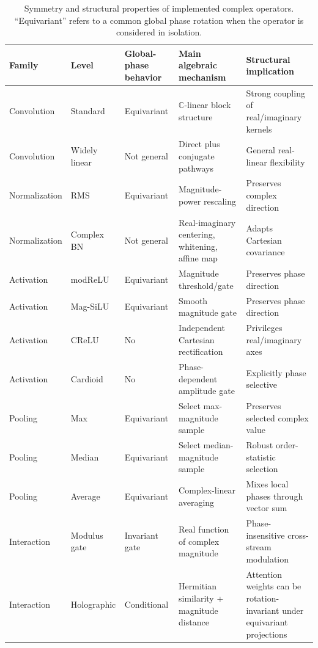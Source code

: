 \begin{table}[t]
\centering
\caption{Symmetry and structural properties of implemented complex operators. ``Equivariant'' refers to a common global phase rotation when the operator is considered in isolation.}
\label{tab:operator-properties}
\scriptsize
\begin{tabularx}{\textwidth}{L{2.2cm}L{2.8cm}C{1.5cm}L{3.6cm}X}
\toprule
Family & Level & Global-phase behavior & Main algebraic mechanism & Structural implication \\
\midrule
Convolution & Standard & Equivariant & $\mathbb{C}$-linear block structure & Strong coupling of real/imaginary kernels \\
Convolution & Widely linear & Not general & Direct plus conjugate pathways & General real-linear flexibility \\
Normalization & RMS & Equivariant & Magnitude-power rescaling & Preserves complex direction \\
Normalization & Complex BN & Not general & Real-imaginary centering, whitening, affine map & Adapts Cartesian covariance \\
Activation & modReLU & Equivariant & Magnitude threshold/gate & Preserves phase direction \\
Activation & Mag-SiLU & Equivariant & Smooth magnitude gate & Preserves phase direction \\
Activation & CReLU & No & Independent Cartesian rectification & Privileges real/imaginary axes \\
Activation & Cardioid & No & Phase-dependent amplitude gate & Explicitly phase selective \\
Pooling & Max & Equivariant & Select max-magnitude sample & Preserves selected complex value \\
Pooling & Median & Equivariant & Select median-magnitude sample & Robust order-statistic selection \\
Pooling & Average & Equivariant & Complex-linear averaging & Mixes local phases through vector sum \\
Interaction & Modulus gate & Invariant gate & Real function of complex magnitude & Phase-insensitive cross-stream modulation \\
Interaction & Holographic & Conditional & Hermitian similarity + magnitude distance & Attention weights can be rotation-invariant under equivariant projections \\
\bottomrule
\end{tabularx}
\end{table}
